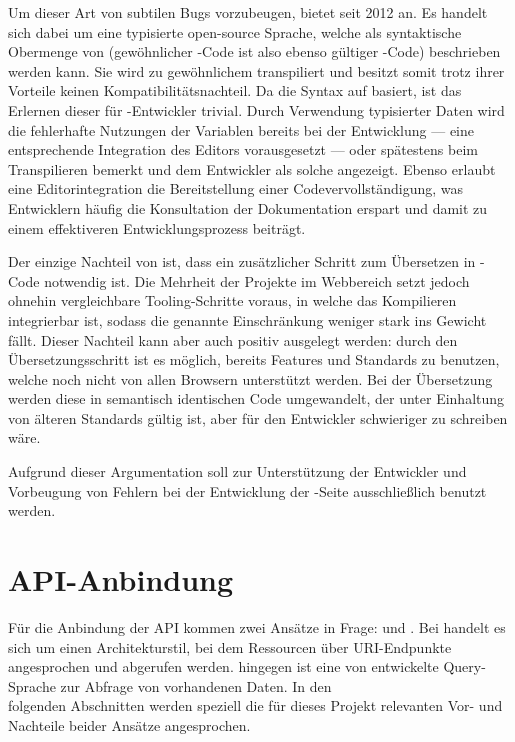 Um dieser Art von subtilen Bugs vorzubeugen, bietet  seit 2012  an. Es handelt sich dabei um eine typisierte open-source Sprache, welche als syntaktische Obermenge von  (gewöhnlicher -Code ist also ebenso gültiger -Code) beschrieben werden kann. Sie wird zu gewöhnlichem  transpiliert und besitzt somit trotz ihrer Vorteile keinen Kompatibilitätsnachteil. Da die Syntax auf  basiert, ist das Erlernen dieser für -Entwickler trivial. Durch Verwendung typisierter Daten wird die fehlerhafte Nutzungen der Variablen bereits bei der Entwicklung --- eine entsprechende Integration des Editors vorausgesetzt --- oder spätestens beim Transpilieren bemerkt und dem Entwickler als solche angezeigt. Ebenso erlaubt eine Editorintegration die Bereitstellung einer Codevervollständigung, was Entwicklern häufig die Konsultation der Dokumentation erspart und damit zu einem effektiveren Entwicklungsprozess beiträgt.

Der einzige Nachteil von  ist, dass ein zusätzlicher Schritt zum Übersetzen in -Code notwendig ist. 
Die Mehrheit der Projekte im Webbereich setzt jedoch ohnehin vergleichbare Tooling-Schritte voraus, in welche das Kompilieren integrierbar ist, sodass die genannte Einschränkung weniger stark ins Gewicht fällt. Dieser Nachteil kann aber auch positiv ausgelegt werden: durch den Übersetzungsschritt ist es möglich, bereits Features und Standards zu benutzen, welche noch nicht von allen Browsern unterstützt werden. Bei der Übersetzung werden diese in semantisch identischen Code umgewandelt, der unter Einhaltung von älteren Standards gültig ist, aber für den Entwickler schwieriger zu schreiben wäre. 

Aufgrund dieser Argumentation soll zur Unterstützung der Entwickler und Vorbeugung von Fehlern bei der Entwicklung der -Seite ausschließlich  benutzt werden. 

\section{API-Anbindung}
Für die Anbindung der API kommen zwei Ansätze in Frage:  und \@. Bei  handelt es sich um einen Architekturstil, bei dem Ressourcen über URI-Endpunkte angesprochen und abgerufen werden.  hingegen ist eine von  entwickelte Query-Sprache zur Abfrage von vorhandenen Daten. In den\\ folgenden Abschnitten werden speziell die für dieses Projekt relevanten Vor- und Nachteile beider Ansätze angesprochen.

